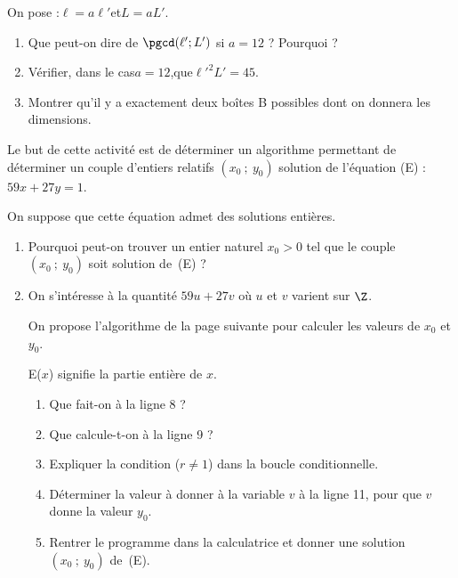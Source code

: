 \begin{activite}
\begin{enumerate}
On pose :\enskip $\ell=a\ell'$\enskip et\enskip $L=aL'$.
\begin{enumerate}
\item Que  peut-on dire de $\pgcd(\ell';L')$ si $a=12$ ? Pourquoi ?
\item Vérifier, dans le cas\enskip $a=12$,\enskip que\enskip $\ell'^2L'=45$.
\item Montrer qu'il y a exactement deux boîtes B possibles dont on donnera les dimensions. 
\end{enumerate}  
\end{enumerate} 
\end{activite}

\vspace{-1cm}

\begin{activite}
  Le but de cette activité est de déterminer un algorithme permettant
  de déterminer un couple d'entiers relatifs $(x_0\ ;\ y_0)$ solution
  de l'équation (E) : \enskip $59x+27y=1$.

On suppose que cette équation admet des solutions entières.\vspace{-10pt}

\begin{enumerate}
\item Pourquoi peut-on trouver un entier naturel $x_0>0$ tel que le
  couple $(x_0\ ;\ y_0)$ soit solution de~(E) ?\medskip
\item On s'intéresse à la quantité $59u+27v$ où $u$ et $v$ varient sur
  $\Z$. 

  On propose l'algorithme de la page suivante pour calculer les
  valeurs de $x_0$ et $y_0$. 

  E($x$) signifie la partie entière de $x$.
\begin{enumerate}
\item Que fait-on à la ligne 8 ?
\item Que calcule-t-on à la ligne 9 ?
\item Expliquer la condition ($r\neq1$) dans la boucle conditionnelle.
\item Déterminer la valeur à donner à la variable $v$ à la ligne 11,
  pour que $v$ donne la valeur $y_0$.
\item Rentrer le programme dans la calculatrice et donner une solution
  $(x_0\ ;\ y_0)$ de~(E).
\end{enumerate}

\pagebreak



\end{enumerate}
\end{activite}
